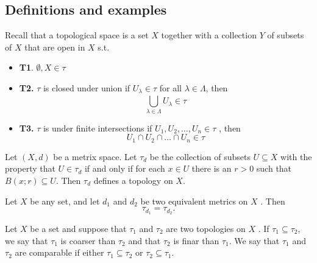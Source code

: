 \documentclass{article}
\theoremstyle{remark}
\begin{document}
\subsection{Definitions and examples}%
\label{sub:definitions_and_examples}



\begin{definition} Recall that a topological space is a set $X$ together with a collection $Y$ of subsets
    of $X$ that are open in $X$ s.t.
    \begin{itemize}
        \item \textbf{T1}.  $ \emptyset , X \in  \tau $
        \item \textbf{T2.} $ \tau $ is closed under union if $U_{\lambda } \in  \tau $ for all $\lambda  \in \Lambda $, then \[
                \bigcup_{\lambda  \in  \Lambda }^{} U_{\lambda } \in \tau
        \]
    \item \textbf{T3.} $\tau  $ is under finite intersections if $U_{1}, U_{2}, \ldots, U_{n} \in \tau $ , then \[
    U_{1} \cap U_{2} \cap \ldots \cap  U_{n} \in \tau
    \]

    \end{itemize}
\end{definition}

\begin{theorem}

    Let $\left( X,d \right)$  be a metrix space. Let $\tau _{d}$ be the collection of subsets $U \subseteq X$ with the
    property that $U \in \tau _{d}$ if and only if for each $x \in U$  there is an $r > 0$ such that $B\left( x;r
    \right) \subseteq  U$. Then $\tau _{d}$  defines a topology on $X$.
\end{theorem}

\begin{theorem}
    Let $X$  be any set, and let $d_{1}$  and $d_{2}$ be two equivalent metrics on $X$ . Then \[
    \tau _{d_{1}} = \tau _{d_{2}} .
    \]
\end{theorem}

\begin{definition}
    Let $X$  be a set and suppose that $\tau _{1}$  and $\tau _{2}$  are two topologies on $X$ . If $\tau _{1} \subseteq
    \tau _{2}$, we say that $\tau _{1 }$  is coarser than $\tau _{2}$ and  that $\tau _{2}$ is finar than $\tau _{1}$.
    We say that $\tau _{1} $ and $\tau _{2}$  are comparable if either $\tau _{1} \subseteq \tau _{2}$  or $\tau _{2}
    \subseteq  \tau _{1}$.

\end{definition}
\end{document}
